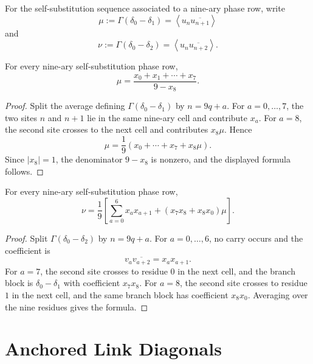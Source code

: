 \begin{definition}
\label{def:innovation-input-nine-complex-first-second-correlations}
For the self-substitution sequence associated to a nine-ary phase row,
write
$$
\mu:=\Gamma(\delta_0-\delta_1)
=
\left\langle u_n\overline{u_{n+1}}\right\rangle
$$
and
$$
\nu:=\Gamma(\delta_0-\delta_2)
=
\left\langle u_n\overline{u_{n+2}}\right\rangle.
$$
\end{definition}

\begin{theorem}
\label{thm:innovation-input-nine-complex-first-correlation-formula}
For every nine-ary self-substitution phase row,
$$
\mu
=
\frac{x_0+x_1+\cdots+x_7}{9-x_8}.
$$
\end{theorem}

\begin{proof}
Split the average defining $\Gamma(\delta_0-\delta_1)$ by
$n=9q+a$. For $a=0,\ldots,7$, the two sites $n$ and $n+1$ lie in the
same nine-ary cell and contribute $x_a$. For $a=8$, the second site
crosses to the next cell and contributes $x_8\mu$. Hence
$$
\mu
=
\frac19
\left(
x_0+\cdots+x_7+x_8\mu
\right).
$$
Since $|x_8|=1$, the denominator $9-x_8$ is nonzero, and the displayed
formula follows.
\end{proof}

\begin{theorem}
\label{thm:innovation-input-nine-complex-second-correlation-formula}
For every nine-ary self-substitution phase row,
$$
\nu
=
\frac19
\left[
\sum_{a=0}^{6}x_ax_{a+1}
+
(x_7x_8+x_8x_0)\mu
\right].
$$
\end{theorem}

\begin{proof}
Split $\Gamma(\delta_0-\delta_2)$ by $n=9q+a$. For
$a=0,\ldots,6$, no carry occurs and the coefficient is
$$
v_a\overline{v_{a+2}}=x_ax_{a+1}.
$$
For $a=7$, the second site crosses to residue $0$ in the next cell, and
the branch block is $\delta_0-\delta_1$ with coefficient $x_7x_8$. For
$a=8$, the second site crosses to residue $1$ in the next cell, and the
same branch block has coefficient $x_8x_0$. Averaging over the nine
residues gives the formula.
\end{proof}

\section{Anchored Link Diagonals}
\label{sec:innovation-input-nine-complex-anchored-link-diagonals}

